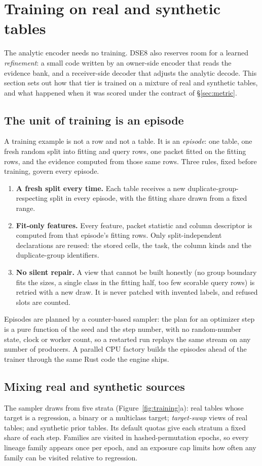 \documentclass[10pt,letterpaper,twocolumn]{article}
\newcommand{\cli}[1]{{\ttfamily\fontsize{8.9}{11}\selectfont #1}}
\begin{document}
\section{Training on real and synthetic tables}\label{sec:training}
The analytic encoder needs no training. \cli{DSE8} also reserves room for a learned \emph{refinement}: a small code written by an owner-side encoder that reads the evidence bank, and a receiver-side decoder that adjusts the analytic decode. This section sets out how that tier is trained on a mixture of real and synthetic tables, and what happened when it was scored under the contract of \S\ref{sec:metric}.

\subsection{The unit of training is an episode}
A training example is not a row and not a table. It is an \emph{episode}: one table, one fresh random split into fitting and query rows, one packet fitted on the fitting rows, and the evidence computed from those same rows. Three rules, fixed before training, govern every episode.
\begin{enumerate}[leftmargin=1.45em,itemsep=2pt]
  \item \textbf{A fresh split every time.} Each table receives a new duplicate-group-respecting split in every episode, with the fitting share drawn from a fixed range.
  \item \textbf{Fit-only features.} Every feature, packet statistic and column descriptor is computed from that episode's fitting rows. Only split-independent declarations are reused: the stored cells, the task, the column kinds and the duplicate-group identifiers.
  \item \textbf{No silent repair.} A view that cannot be built honestly (no group boundary fits the sizes, a single class in the fitting half, too few scorable query rows) is retried with a new draw. It is never patched with invented labels, and refused slots are counted.
\end{enumerate}
Episodes are planned by a counter-based sampler: the plan for an optimizer step is a pure function of the seed and the step number, with no random-number state, clock or worker count, so a restarted run replays the same stream on any number of producers. A parallel CPU factory builds the episodes ahead of the trainer through the same Rust code the engine ships.

\subsection{Mixing real and synthetic sources}
The sampler draws from five strata (Figure~\ref{fig:training}a): real tables whose target is a regression, a binary or a multiclass target; \emph{target-swap} views of real tables; and synthetic prior tables. Its default quotas give each stratum a fixed share of each step. Families are visited in hashed-permutation epochs, so every lineage family appears once per epoch, and an exposure cap limits how often any family can be visited relative to regression.
\end{document}
